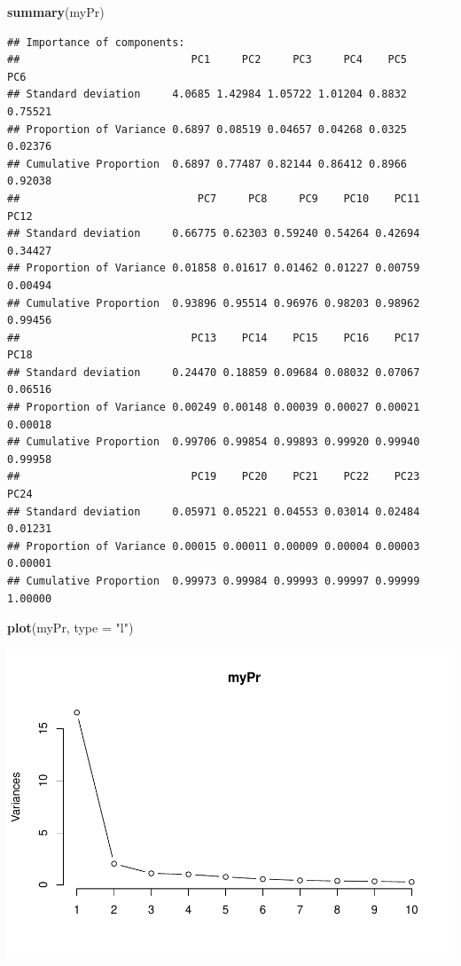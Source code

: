 \documentclass[]{article}
\newenvironment{Shaded}{\begin{snugshade}}{\end{snugshade}}
\newcommand{\KeywordTok}[1]{\textcolor[rgb]{0.13,0.29,0.53}{\textbf{#1}}}
\newcommand{\DataTypeTok}[1]{\textcolor[rgb]{0.13,0.29,0.53}{#1}}
\newcommand{\StringTok}[1]{\textcolor[rgb]{0.31,0.60,0.02}{#1}}
\newcommand{\NormalTok}[1]{#1}
\begin{document}
\begin{Shaded}
\begin{Highlighting}[]
\KeywordTok{summary}\NormalTok{(myPr)}
\end{Highlighting}
\end{Shaded}

\begin{verbatim}
## Importance of components:
##                           PC1     PC2     PC3     PC4    PC5     PC6
## Standard deviation     4.0685 1.42984 1.05722 1.01204 0.8832 0.75521
## Proportion of Variance 0.6897 0.08519 0.04657 0.04268 0.0325 0.02376
## Cumulative Proportion  0.6897 0.77487 0.82144 0.86412 0.8966 0.92038
##                            PC7     PC8     PC9    PC10    PC11    PC12
## Standard deviation     0.66775 0.62303 0.59240 0.54264 0.42694 0.34427
## Proportion of Variance 0.01858 0.01617 0.01462 0.01227 0.00759 0.00494
## Cumulative Proportion  0.93896 0.95514 0.96976 0.98203 0.98962 0.99456
##                           PC13    PC14    PC15    PC16    PC17    PC18
## Standard deviation     0.24470 0.18859 0.09684 0.08032 0.07067 0.06516
## Proportion of Variance 0.00249 0.00148 0.00039 0.00027 0.00021 0.00018
## Cumulative Proportion  0.99706 0.99854 0.99893 0.99920 0.99940 0.99958
##                           PC19    PC20    PC21    PC22    PC23    PC24
## Standard deviation     0.05971 0.05221 0.04553 0.03014 0.02484 0.01231
## Proportion of Variance 0.00015 0.00011 0.00009 0.00004 0.00003 0.00001
## Cumulative Proportion  0.99973 0.99984 0.99993 0.99997 0.99999 1.00000
\end{verbatim}

\begin{Shaded}
\begin{Highlighting}[]
\KeywordTok{plot}\NormalTok{(myPr, }\DataTypeTok{type =} \StringTok{"l"}\NormalTok{)}
\end{Highlighting}
\end{Shaded}

\includegraphics{TSLproject_files/figure-latex/unnamed-chunk-19-1.pdf}
\end{document}
